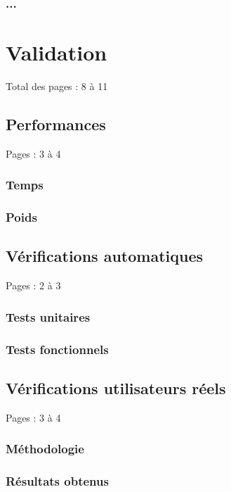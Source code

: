 \documentclass{eplmastersthesis_FR}
\begin{document}
			\subsection*{...}

	\chapter{Validation}

		Total des pages : 8 à 11

		\section{Performances}

			Pages : 3 à 4

			\subsection*{Temps}
			\subsection*{Poids}

		\section{Vérifications automatiques}

			Pages : 2 à 3

			\subsection*{Tests unitaires}
			\subsection*{Tests fonctionnels}

		\section{Vérifications utilisateurs réels}

			Pages : 3 à 4

			\subsection*{Méthodologie}
			\subsection*{Résultats obtenus}
\end{document}
